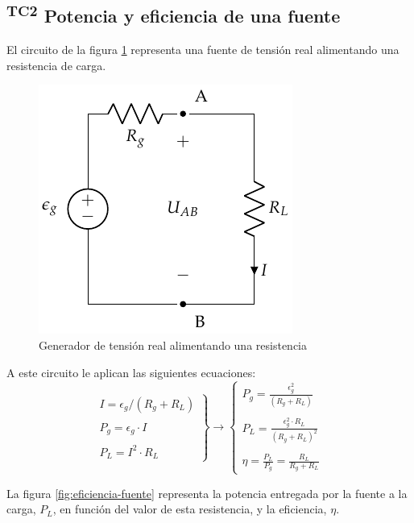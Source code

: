   \subsection{\textsuperscript{TC2} Potencia y eficiencia de una
    fuente}
  \label{sec:potencia-fuente}

  El circuito de la figura \ref{fig:fuente-tension-carga} representa
  una fuente de tensión real alimentando una resistencia de carga.
  \begin{figure}
    \centering
    \includegraphics[height=0.2\textheight]{../figs/FuenteTensionRealConCarga.pdf}
    \caption{Generador de tensión real alimentando una resistencia}
    \label{fig:fuente-tension-carga}
  \end{figure}
  A este circuito le aplican las siguientes ecuaciones:
  \[
    \left.
      \begin{array}{c}
        I = \epsilon_g/(R_g + R_L)\\
        \\
        P_g = \epsilon_g \cdot I\\
        \\
        P_L = I^2 \cdot R_L
      \end{array} \right\}
    \rightarrow \left\{
      \begin{array}{c}
        P_g = \frac{\epsilon^2_g}{(R_g + R_L)}\\
        \\
        P_L = \frac{\epsilon^2_g \cdot R_L}{(R_g + R_L)^2}\\
        \\
        \eta = \frac{P_L}{P_g} = \frac{R_L}{R_g + R_L}
      \end{array}\right.
  \]

  La figura \ref{fig:eficiencia-fuente} representa la potencia
  entregada por la fuente a la carga, $P_L$, en función del valor de
  esta resistencia, y la eficiencia, $\eta$.

